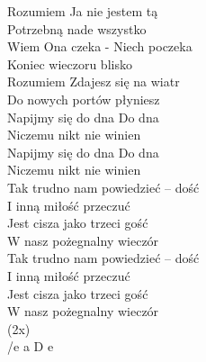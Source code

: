 \begin{text}
Rozumiem Ja nie jestem tą \\
Potrzebną nade wszystko \\
Wiem Ona czeka - Niech poczeka \\
Koniec wieczoru blisko \\
Rozumiem Zdajesz się na wiatr \\
Do nowych portów płyniesz \\
Napijmy się do dna Do dna \\
Niczemu nikt nie winien \\
Napijmy się do dna Do dna\\
Niczemu nikt nie winien \\

\vin Tak trudno nam powiedzieć – dość \\
\vin I inną miłość przeczuć \\
\vin Jest cisza jako trzeci gość \\
\vin W nasz pożegnalny wieczór \\
\vin Tak trudno nam powiedzieć – dość \\
\vin I inną miłość przeczuć \\
\vin Jest cisza jako trzeci gość \\
\vin W nasz pożegnalny wieczór \\
\vin (2x)\\
\vin /e a D e\\
\end{text}

